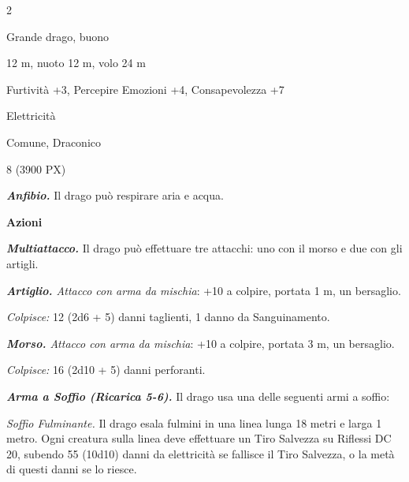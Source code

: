 \begin{multicols}{2}
{%

\begin{description}[noitemsep, topsep=0pt, parsep=0pt, partopsep=0pt, itemsep=1pt, leftmargin=2.35cm,  labelwidth=2.2cm, itemindent=0cm, listparindent=0pt] %
\setlength{\baselineskip}{10pt}
\item[\textbf{Taglia/Tipo}] Grande drago, buono
\item[\textbf{Caratt.}] 
\item[\textbf{Punti Ferita}] 
\item[\textbf{Movimento}] 12 m, nuoto 12 m, volo 24 m
\item[\textbf{Tiri Salvez.}] 
\item[\textbf{Comp.}] Furtività +3, Percepire Emozioni +4, Consapevolezza +7
\item[\textbf{Imm. Danni}] Elettricità
\item[\textbf{Sensi}] 
\item[\textbf{Linguaggi}] Comune, Draconico
\item[\textbf{Sfida}] 8 (3900 PX)
\end{description}
\smallskip

\emph{\textbf{Anfibio.}} Il drago può respirare aria e acqua.

\textbf{Azioni}

\emph{\textbf{Multiattacco.}} Il drago può effettuare tre attacchi: uno con il morso e due con gli artigli.

\emph{\textbf{Artiglio.} Attacco con arma da mischia}: +10 a colpire, portata 1 m, un bersaglio.

\emph{Colpisce:} 12 (2d6 + 5) danni taglienti, 1 danno da Sanguinamento.

\emph{\textbf{Morso.} Attacco con arma da mischia}: +10 a colpire, portata 3 m, un bersaglio.

\emph{Colpisce:} 16 (2d10 + 5) danni perforanti.

\emph{\textbf{Arma a Soffio (Ricarica 5-6).}} Il drago usa una delle seguenti armi a soffio:

\emph{Soffio Fulminante.} Il drago esala fulmini in una linea lunga 18 metri e larga 1 metro. Ogni creatura sulla linea deve effettuare un Tiro Salvezza su Riflessi DC 20, subendo 55 (10d10) danni da elettricità se fallisce il Tiro Salvezza, o la metà di questi danni se lo riesce.

}
\end{multicols}
